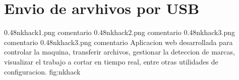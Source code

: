 \section{Envio de arvhivos por USB}

\subfigtwotwo
         {0.48}{nkhack1.png} {comentario}
         {0.48}{nkhack2.png} {comentario}
         {0.48}{nkhack3.png} {comentario}
         {0.48}{nkhack3.png} {comentario}
         {Aplicacion web desarrollada para controlar la maquina, transferir archivos, gestionar la deteccion de marcas, visualizar el trabajo a cortar en tiempo real, entre otras utilidades de configuracion.}
         {fig:nkhack}
